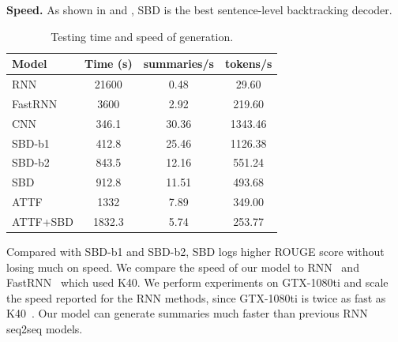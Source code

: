 \textbf{Speed.} 
As shown in  and , 
SBD is the best sentence-level backtracking decoder.

\begin{table}[th!]
\centering
\small
\begin{tabular}{|l|c|c|c|}
\hline
Model & Time (s) & summaries/s & tokens/s \\
\hline
RNN  &  21600 & 0.48 & 29.60 \\
FastRNN &  3600 & 2.92 & 219.60 \\
\hline
CNN &  346.1 & 30.36 & 1343.46 \\
SBD-b1 &  412.8 & 25.46 & 1126.38 \\
SBD-b2 &  843.5 & 12.16 & 551.24 \\
SBD &  912.8 & 11.51 & 493.68 \\
ATTF & 1332 & 7.89 &  349.00 \\
ATTF+SBD & 1832.3 & 5.74 &  253.77 \\
\hline
\end{tabular}
\caption{Testing time and speed of generation.}
\label{tab:eval_speed}
\end{table}


Compared with SBD-b1 and SBD-b2,
SBD logs higher ROUGE score without losing much on speed. 
We compare the speed of our model to RNN~\cite{SeeLM17} and FastRNN~\cite{P18-1063}
which used K40. 
We perform experiments on GTX-1080ti and scale the speed 
reported for the RNN methods,
since GTX-1080ti is twice as fast as K40~\cite{gehring2017convs2s}.
Our model can 
generate summaries much faster than previous RNN seq2seq models.

\DIFdelbegin %

